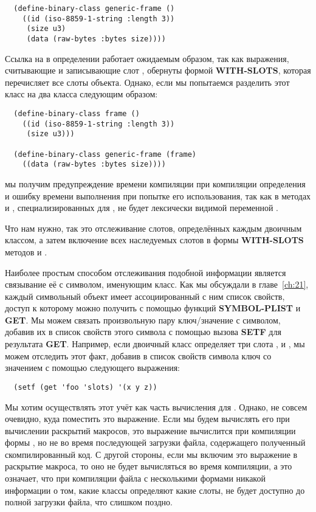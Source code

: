 \begin{lstlisting}
  (define-binary-class generic-frame ()
    ((id (iso-8859-1-string :length 3))
     (size u3)
     (data (raw-bytes :bytes size))))
\end{lstlisting}

Ссылка на  в определении  работает ожидаемым образом, так как
выражения, считывающие и записывающие слот , обернуты формой
\textbf{WITH-SLOTS}, которая перечисляет все слоты объекта. Однако, если мы попытаемся
разделить этот класс на два класса следующим образом:

\begin{lstlisting}
  (define-binary-class frame ()
    ((id (iso-8859-1-string :length 3))
     (size u3)))

  (define-binary-class generic-frame (frame)
    ((data (raw-bytes :bytes size))))
\end{lstlisting}

мы получим предупреждение времени компиляции при компиляции определения
 и ошибку времени выполнения при попытке его использования, так как в
методах  и , специализированных для
, не будет лексически видимой переменной .

Что нам нужно, так это отслеживание слотов, определённых каждым двоичным классом, а затем
включение всех наследуемых слотов в формы \textbf{WITH-SLOTS} методов  и
.

Наиболее простым способом отслеживания подобной информации является связывание её с
символом, именующим класс. Как мы обсуждали в главе~\ref{ch:21}, каждый символьный объект
имеет ассоциированный с ним список свойств, доступ к которому можно получить с помощью
функций \textbf{SYMBOL-PLIST} и \textbf{GET}. Мы можем связать произвольную пару
ключ/значение с символом, добавив их в список свойств этого символа с помощью вызова
\textbf{SETF} для результата \textbf{GET}. Например, если двоичный класс 
определяет три слота ,  и , мы можем отследить этот факт, добавив
в список свойств символа  ключ  со значением  с
помощью следующего выражения:

\begin{lstlisting}
  (setf (get 'foo 'slots) '(x y z))
\end{lstlisting}

Мы хотим осуществлять этот учёт как часть вычисления  для
. Однако, не совсем очевидно, куда поместить это выражение. Если мы будем
вычислять его при вычислении раскрытий макросов, это выражение вычислится при компиляции
формы , но не во время последующей загрузки файла, содержащего
полученный скомпилированный код. С другой стороны, если мы включим это выражение в
раскрытие макроса, то оно не будет вычисляться во время компиляции, а это означает, что
при компиляции файла с несколькими формами  никакой информации о
том, какие классы определяют какие слоты, не будет доступно до полной загрузки файла, что
слишком поздно.

